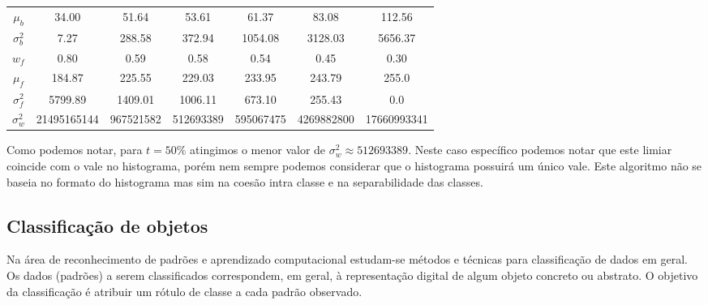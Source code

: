 \documentclass[a4paper,11pt]{article}
\begin{document}
\begin{center}
\begin{tabular}[p]{@{}ccccccc@{}}
  $\mu_b$ & 34.00 & 51.64 & 53.61 & 61.37 & 83.08 & 112.56 \\

  $\sigma^{2}_{b}$ & 7.27 & 288.58 & 372.94 & 1054.08 & 3128.03 & 5656.37 \\

  $w_{f}$ & 0.80 & 0.59 & 0.58 & 0.54 & 0.45 & 0.30 \\

  $\mu_{f}$ & 184.87 & 225.55 & 229.03 & 233.95 & 243.79 & 255.0 \\

  $\sigma^{2}_{f}$ & 5799.89 & 1409.01 & 1006.11 & 673.10 & 255.43 & 0.0 \\

  $\sigma^{2}_{w}$ & 21495165144 & 967521582 & 512693389 & 595067475 & 4269882800 & 17660993341 \\


\end{tabular}
\end{center}

Como podemos notar, para $t = 50\%$ atingimos o menor valor de $\sigma^{2}_{w} \approx 512693389$. Neste caso específico podemos notar que este limiar coincide com o vale no histograma, porém nem sempre podemos considerar que o histograma possuirá um único vale. Este algoritmo não se baseia no formato do histograma mas sim na coesão intra classe e na separabilidade das classes.

% 
% 
% 
% 
% 
% 
% 
% 


\subsection{Classificação de objetos}

Na área de reconhecimento de padrões e aprendizado computacional
estudam-se métodos e técnicas para classificação de dados em geral. Os
dados (padrões) a serem classificados correspondem, em geral, à
representação digital de algum objeto concreto ou abstrato. O objetivo
da classificação é atribuir um rótulo de classe a cada padrão
observado.
\end{document}
